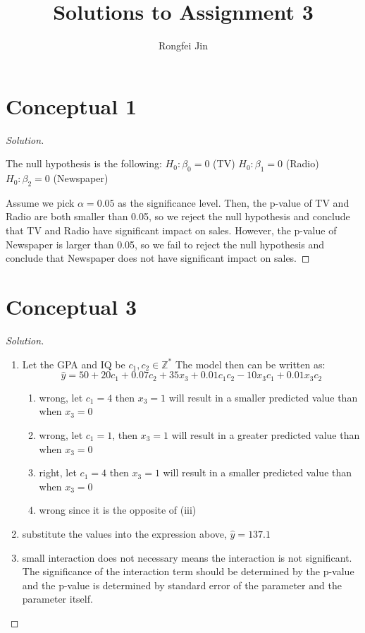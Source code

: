 \documentclass{article}
\title{Solutions to Assignment 3}
\author{Rongfei Jin}
\newenvironment{solution}
{\renewcommand\qedsymbol{$\blacksquare$}
\begin{proof}[Solution]$ $}
  {
\end{proof}}
\begin{document}
\maketitle
\section*{Conceptual 1}
\begin{solution}

  The null hypothesis is the following:
  \(H_0:\beta_0 = 0\) (TV)
  \(H_0:\beta_1 = 0\) (Radio)
  \(H_0:\beta_2 = 0\) (Newspaper)

  Assume we pick \(\alpha = 0.05\) as the significance level.
  Then, the p-value of TV and Radio are both smaller than 0.05, so we reject the null hypothesis and conclude that TV and Radio have significant impact on sales.
  However, the p-value of Newspaper is larger than 0.05, so we fail to reject the null hypothesis and conclude that Newspaper does not have significant impact on sales.

\end{solution}

\section*{Conceptual 3}
\begin{solution}
  \begin{enumerate}[label=(\alph*)]
    \item Let the GPA and IQ be \(c_1,c_2 \in \mathbb Z^* \)
      The model then can be written as:
      \[
        \hat y = 50 + 20c_1 + 0.07c_2 + 35x_3 + 0.01c_1 c_2 -10x_3c_1 + 0.01x_3c_2
      \]
      \begin{enumerate}[label=(\roman*)]
        \item wrong, let \(c_1 = 4\) then \(x_3 = 1\) will result in a smaller predicted value than when \(x_3=0\)
        \item wrong, let \(c_1 = 1\), then \(x_3 = 1\) will result in a greater predicted value than when \(x_3=0\)
        \item right, let \(c_1 = 4\) then \(x_3 = 1\) will result in a smaller predicted value than when \(x_3=0\)
        \item wrong since it is the opposite of (iii)
      \end{enumerate}
    \item substitute the values into the expression above, \(\hat y = 137.1\)
    \item small interaction does not necessary means the interaction is not significant. The significance of the interaction term should be determined by the p-value and the p-value is determined by standard error of the parameter and the parameter itself.
  \end{enumerate}
\end{solution}
\end{document}
